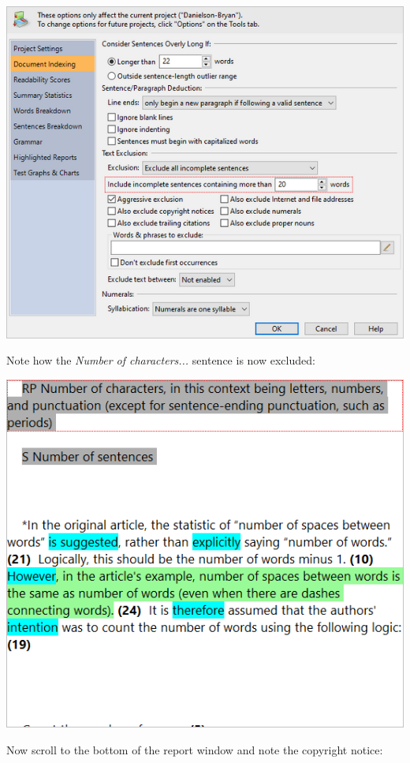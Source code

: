 \documentclass[
]{book}
\theoremstyle{definition}
\theoremstyle{definition}
\theoremstyle{definition}
\theoremstyle{definition}
\theoremstyle{remark}
\begin{document}
\includegraphics{Images/ExclusionExampleIncompLengthValue.png}

Note how the \emph{Number of characters...} sentence is now excluded:

\includegraphics{Images/ExclusionExampleLongSentenceExcluded.png}

Now scroll to the bottom of the report window and note the copyright notice:
\end{document}

